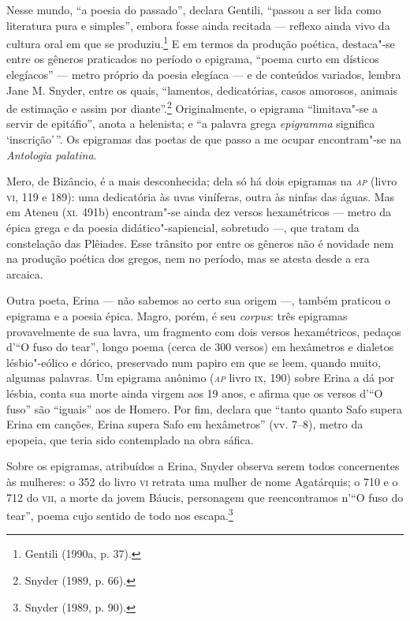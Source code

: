 Nesse mundo, “a poesia do passado”, declara Gentili, “passou a
ser lida como literatura pura e simples”, embora fosse ainda recitada --- reflexo
ainda vivo da cultura oral em que se produziu.\footnote{ Gentili (1990a, p. 37).} E em termos da produção poética,
destaca"-se entre os gêneros praticados no período o epigrama, “poema curto em
dísticos elegíacos” --- metro próprio da poesia elegíaca --- e de conteúdos
variados, lembra Jane M. Snyder, entre os quais, “lamentos,
dedicatórias, casos amorosos, animais de estimação e assim por diante”.\footnote{ Snyder (1989, p. 66).}
Originalmente, o epigrama “limitava"-se a servir de epitáfio”, anota a
helenista; e “a palavra grega \textit{epigramma} significa ‘inscrição’\,”. Os
epigramas das poetas de que passo a me ocupar encontram"-se na \textit{Antologia
palatina}.

Mero, de Bizâncio, é a mais desconhecida; dela só há dois epigramas na
\textit{\textsc{ap}} (livro \textsc{vi}, 119 e 189): uma dedicatória às uvas viníferas,
outra às ninfas das águas. Mas em Ateneu (\textsc{xi}. 491b) encontram"-se ainda dez
versos hexamétricos --- metro da épica grega e da poesia didático"-sapiencial,
sobretudo ---, que tratam da constelação das Plêiades. Esse trânsito por entre os
gêneros não é novidade nem na produção poética dos gregos, nem no período, mas
se atesta desde a era arcaica.

Outra poeta, Erina --- não sabemos ao certo sua origem ---, também praticou o
epigrama e a poesia épica. Magro, porém, é seu \textit{corpus}: três epigramas
provavelmente de sua lavra, um fragmento com dois versos hexamétricos, pedaços
d’“O fuso do tear”, longo poema (cerca de 300 versos) em hexâmetros e dialetos
lésbio"-eólico e dórico, preservado num papiro em que se leem, quando muito,
algumas palavras. Um epigrama anônimo (\textit{\textsc{ap}} livro \textsc{ix}, 190)
sobre Erina a dá por lésbia, conta sua morte ainda virgem aos 19 anos, e
afirma que os versos d’“O fuso” são ``iguais” aos de Homero. Por fim,
declara que ``tanto quanto Safo supera Erina em canções, Erina supera
Safo em hexâmetros” (vv. 7--8), metro da epopeia, que teria sido contemplado na
obra sáfica.

Sobre os epigramas, atribuídos a Erina, Snyder observa
serem todos concernentes às mulheres: o 352 do livro \textsc{vi}
retrata uma mulher de nome Agatárquis; o 710 e o 712 do \textsc{vii}, a morte da jovem
Báucis, personagem que reencontramos n’“O fuso do tear”, poema cujo sentido de
todo nos escapa.\footnote{ Snyder (1989, p. 90).}

